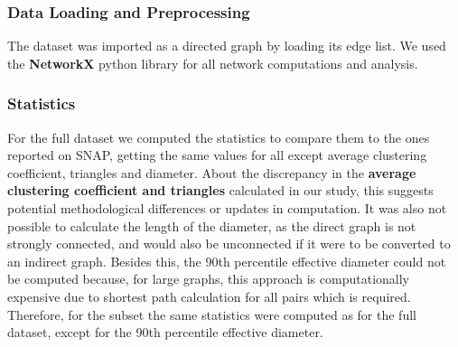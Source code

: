 \documentclass[conference]{IEEEtran}
\begin{document}
\subsubsection{Data Loading and Preprocessing}
The dataset was imported as a directed graph by loading its edge list. We used the \textbf{NetworkX} python library for all network computations and analysis.

\subsubsection{Statistics}
For the full dataset we computed the statistics to compare them to the ones reported on SNAP, getting the same values for all except average clustering coefficient, triangles and diameter. About the discrepancy in the \textbf{average clustering coefficient and triangles} calculated in our study, this suggests potential methodological differences or updates in computation. It was also not possible to calculate the length of the diameter, as the direct graph is not strongly connected, and would also be unconnected if it were to be converted to an indirect graph.  Besides this, the 90th percentile effective diameter could not be computed because, for large graphs, this approach is computationally expensive due to shortest path calculation for all pairs which is required. Therefore, for the subset the same statistics were computed as for the full dataset, except for the 90th percentile effective diameter.
\end{document}
